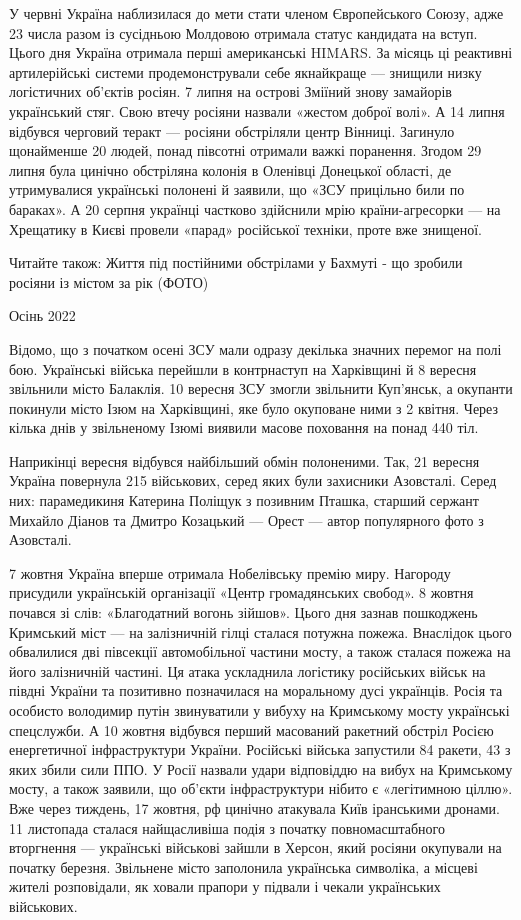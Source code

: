 У червні Україна наблизилася до мети стати членом Європейського Союзу, адже 23
числа разом із сусідньою Молдовою отримала статус кандидата на вступ. Цього дня
Україна отримала перші американські HIMARS. За місяць ці реактивні
артилерійські системи продемонстрували себе якнайкраще — знищили низку
логістичних об'єктів росіян. 7 липня на острові Зміїний знову замайорів
український стяг. Свою втечу росіяни назвали «жестом доброї волі». А 14 липня
відбувся черговий теракт — росіяни обстріляли центр Вінниці. Загинуло
щонайменше 20 людей, понад півсотні отримали важкі поранення. Згодом 29 липня
була цинічно обстріляна колонія в Оленівці Донецької області, де утримувалися
українські полонені й заявили, що «ЗСУ прицільно били по бараках». А 20 серпня
українці частково здійснили мрію країни-агресорки — на Хрещатику в Києві
провели «парад» російської техніки, проте вже знищеної.

Читайте також: Життя під постійними обстрілами у Бахмуті - що зробили росіяни
із містом за рік (ФОТО)

Осінь 2022

Відомо, що з початком осені ЗСУ мали одразу декілька значних перемог на полі
бою. Українські війська перейшли в контрнаступ на Харківщині й 8 вересня
звільнили місто Балаклія. 10 вересня ЗСУ змогли звільнити Куп'янськ, а окупанти
покинули місто Ізюм на Харківщині, яке було окуповане ними з 2 квітня. Через
кілька днів у звільненому Ізюмі виявили масове поховання на понад 440 тіл.

Наприкінці вересня відбувся найбільший обмін полоненими. Так, 21 вересня
Україна повернула 215 військових, серед яких були захисники Азовсталі. Серед
них: парамедикиня Катерина Поліщук з позивним Пташка, старший сержант Михайло
Діанов та Дмитро Козацький — Орест — автор популярного фото з Азовсталі. 

7 жовтня Україна вперше отримала Нобелівську премію миру. Нагороду присудили
українській організації «Центр громадянських свобод». 8 жовтня почався зі слів:
«Благодатний вогонь зійшов». Цього дня зазнав пошкоджень Кримський міст — на
залізничній гілці сталася потужна пожежа. Внаслідок цього обвалилися дві
півсекції автомобільної частини мосту, а також сталася пожежа на його
залізничній частині. Ця атака ускладнила логістику російських військ на півдні
України та позитивно позначилася на моральному дусі українців. Росія та
особисто володимир путін звинуватили у вибуху на Кримському мосту українські
спецслужби. А 10 жовтня відбувся перший масований ракетний обстріл Росією
енергетичної інфраструктури України. Російські війська запустили 84 ракети, 43
з яких збили сили ППО. У Росії назвали удари відповіддю на вибух на Кримському
мосту, а також заявили, що об'єкти інфраструктури нібито є «легітимною ціллю».
Вже через тиждень, 17 жовтня, рф цинічно атакувала Київ іранськими дронами. 11
листопада сталася найщасливіша подія з початку повномасштабного вторгнення —
українські військові зайшли в Херсон, який росіяни окупували на початку
березня. Звільнене місто заполонила українська символіка, а місцеві жителі
розповідали, як ховали прапори у підвали і чекали українських військових.

